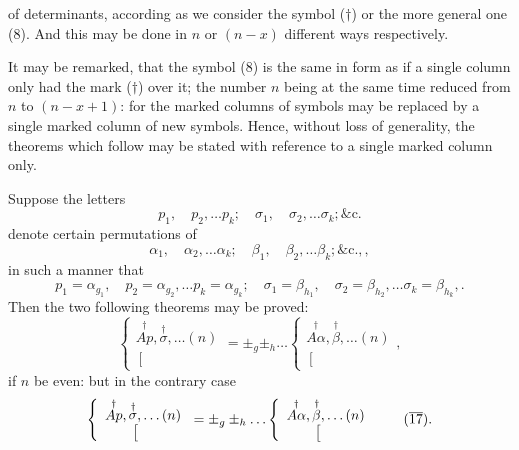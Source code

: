 \documentclass[11pt,a4paper]{book}
\begin{document}
of determinants, according as we consider the symbol ($\dagger$) or the more general one (8).
And this may be done in $n$ or $(n-x)$ different ways respectively.

It may be remarked, that the symbol (8) is the same in form as if a single
column only had the mark ($\dagger$) over it; the number $n$ being at the same time
reduced from $n$ to $(n-x+1)$: for the marked columns of symbols may be replaced
by a single marked column of new symbols. Hence, without loss of generality, the
theorems which follow may be stated with reference to a single marked column only.

Suppose the letters
\[
p_1, \quad p_2, \ldots p_k; \quad \sigma_1, \quad \sigma_2, \ldots \sigma_k; \&\text{c.}
\tag{14}
\]
denote certain permutations of
\[
\alpha_1, \quad \alpha_2, \ldots \alpha_k; \quad \beta_1, \quad \beta_2, \ldots \beta_k; \&\text{c.},
\tag{15},
\]
in such a manner that
\[
p_1 = \alpha_{g_1}, \quad p_2 = \alpha_{g_2}, \ldots p_k = \alpha_{g_k}; \quad
\sigma_1 = \beta_{h_1}, \quad \sigma_2 = \beta_{h_2}, \ldots \sigma_k = \beta_{h_k},
\tag{16}.
\]
Then the two following theorems may be proved:
\[
\left\{\begin{array}{c}
\stackrel{\dagger}{Ap}, \stackrel{\dagger}{\sigma}, \ldots (n) \\
\left[\begin{array}{c}
\\
\end{array}\right.
\end{array}\right.
= \pm_g \pm_h \ldots
\left\{\begin{array}{c}
\stackrel{\dagger}{A\alpha}, \stackrel{\dagger}{\beta}, \ldots (n) \\
\left[\begin{array}{c}
\\
\end{array}\right.
\end{array}\right.
\tag{17},
\]
if $n$ be even: but in the contrary case
\[
\left\{\begin{array}{c}
\stackrel{\dagger}{Ap}, \stackrel{\dagger}{\sigma}, \ldots (n) \\
\left[\begin{array}{c}
\\
\end{array}\right.
\end{array}\right.
= \pm_g \pm_h \ldots
\left\{\begin{array}{c}
\stackrel{\dagger}{A\alpha}, \stackrel{\dagger}{\beta}, \ldots (n) \\
\left[\begin{array}{c}
\\
\end{array}\right.
\end{array}\right.
\tag{$\overline{17}$}.
\]
\end{document}
